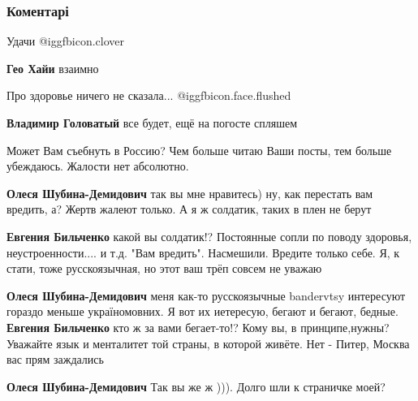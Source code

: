  
 
 
 
 
\subsubsection{Коментарі}

\begin{itemize} %
Удачи  @igg{fbicon.clover} 

\begin{itemize} %
\textbf{Гео Хайи} взаимно
\end{itemize} %

Про здоровье ничего не сказала... @igg{fbicon.face.flushed} 

\begin{itemize} %
\textbf{Владимир Головатый} все будет, ещё на погосте спляшем
\end{itemize} %

Может Вам съебнуть в Россию? Чем больше читаю Ваши посты, тем больше убеждаюсь. Жалости нет абсолютно.

\begin{itemize} %
\textbf{Олеся Шубина-Демидович} так вы мне нравитесь) ну, как перестать вам вредить, а? Жертв жалеют только. А я ж солдатик, таких в плен не берут

\textbf{Евгения Бильченко} какой вы солдатик!? Постоянные сопли по поводу здоровья, неустроенности.... и т.д. "Вам вредить". Насмешили. Вредите только себе. Я, к стати, тоже русскоязычная, но этот ваш трёп совсем не уважаю

\textbf{Олеся Шубина-Демидович} меня как-то русскоязычные bandervtsy интересуют гораздо меньше україномовних. Я вот их иетересую, бегают и бегают, бедные.
\textbf{Евгения Бильченко} кто ж за вами бегает-то!? Кому вы, в принципе,нужны? Уважайте язык и менталитет той страны, в которой живёте. Нет - Питер, Москва вас прям заждались

\textbf{Олеся Шубина-Демидович} Так вы же ж ))). Долго шли к страничке моей?


\end{itemize}
\end{itemize}
